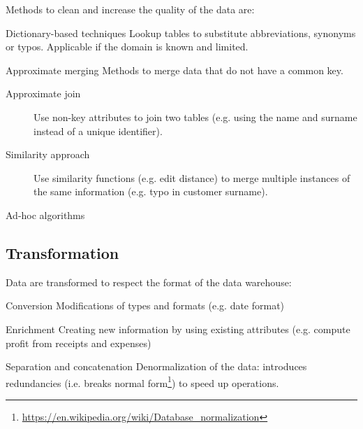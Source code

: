 Methods to clean and increase the quality of the data are:
\begin{descriptionlist}
    \item[Dictionary-based techniques] 
        Lookup tables to substitute abbreviations, synonyms or typos.
        Applicable if the domain is known and limited.
        
    \item[Approximate merging] 
        Methods to merge data that do not have a common key.
        \begin{description}
            \item[Approximate join]
                Use non-key attributes to join two tables (e.g. using the name and surname instead of a unique identifier).

            \item[Similarity approach]
                Use similarity functions (e.g. edit distance) to merge multiple instances of the same information
                (e.g. typo in customer surname).
        \end{description}
    
    \item[Ad-hoc algorithms] 
\end{descriptionlist}


\subsection{Transformation}
Data are transformed to respect the format of the data warehouse:
\begin{descriptionlist}
    \item[Conversion] 
        Modifications of types and formats (e.g. date format)
    
    \item[Enrichment] 
        Creating new information by using existing attributes (e.g. compute profit from receipts and expenses)

    \item[Separation and concatenation] 
        Denormalization of the data: introduces redundancies (i.e. breaks normal form\footnote{\url{https://en.wikipedia.org/wiki/Database_normalization}}) 
        to speed up operations.
\end{descriptionlist}


